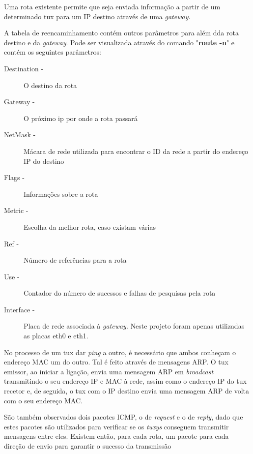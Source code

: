 \documentclass[11pt]{article}
\begin{document}
Uma rota existente permite que seja enviada informação a partir de um determinado tux para um IP destino através de uma \textit{gateway}.


A tabela de reencaminhamento contém outros parâmetros para além dda rota destino e da \textit{gateway}. Pode ser visualizada através do comando "\textbf{route -n}" e contém os seguintes parâmetros:

\begin{description}

\item[Destination -] O destino da rota

\item[Gateway -] O próximo ip por onde a rota passará

\item[NetMask -] Mácara de rede utilizada para encontrar o ID da rede a partir do endereço IP do destino

\item[Flags -] Informações sobre a rota

\item[Metric -] Escolha da melhor rota, caso existam várias

\item[Ref -] Número de referências para a rota

\item[Use -] Contador do número de sucessos e falhas de pesquisas pela rota

\item[Interface -] Placa de rede associada à \textit{gateway}. Neste projeto foram apenas utilizadas as placas eth0 e eth1.

\end{description}

No processo de um tux dar \textit{ping} a outro, é necessário que ambos conheçam o endereço MAC um do outro.
Tal é feito através de mensagens ARP. O tux emissor, ao iniciar a ligação, envia uma mensagem ARP em \textit{broadcast} transmitindo o seu endereço IP e MAC à rede, assim como o endereço IP do tux recetor e, de seguida, o tux com o IP destino envia uma mensagem ARP de volta com o seu endereço MAC.

São também observados dois pacotes ICMP, o de \textit{request} e o de \textit{reply}, dado que estes pacotes são utilizados para verificar se os \textit{tuxys} conseguem transmitir mensagens entre eles. Existem então, para cada rota, um pacote para cada direção de envio para garantir o sucesso da transmissão
\end{document}
